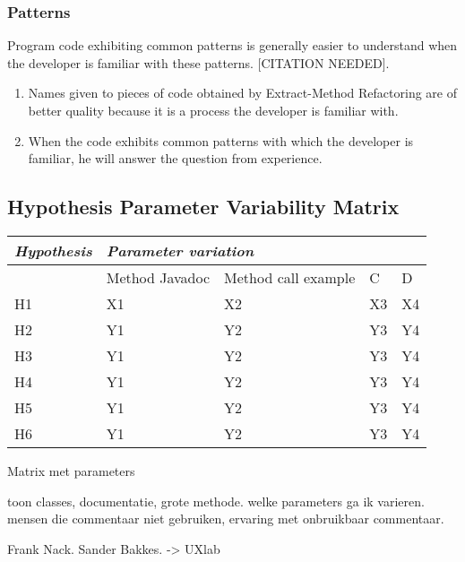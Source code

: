 \subsubsection{Patterns}
Program code exhibiting common patterns is generally easier to understand when the developer is familiar with these patterns. {\color{red}[CITATION NEEDED]}.
\begin{enumerate}
\item Names given to pieces of code obtained by Extract-Method Refactoring are of better quality because it is a process the developer is familiar with.
\item When the code exhibits common patterns with which the developer is familiar, he will answer the question from experience. 
\end{enumerate}

\subsection{Hypothesis Parameter Variability Matrix}

\begin{tabular}{ *5l }
\emph{Hypothesis} & \multicolumn{4}{l}{\emph{Parameter variation}} \\
\hline
   & Method Javadoc  & Method call example  & C  & D  \\ 
H1 & X1 & X2 & X3 & X4 \\ 
H2 & Y1 & Y2 & Y3 & Y4 \\
H3 & Y1 & Y2 & Y3 & Y4 \\
H4 & Y1 & Y2 & Y3 & Y4 \\
H5 & Y1 & Y2 & Y3 & Y4 \\
H6 & Y1 & Y2 & Y3 & Y4 \\
\hline
\end{tabular}

Matrix met parameters

toon classes, documentatie, grote methode. welke parameters ga ik varieren. mensen die commentaar niet gebruiken, ervaring met onbruikbaar commentaar.

Frank Nack. Sander Bakkes. -> UXlab
